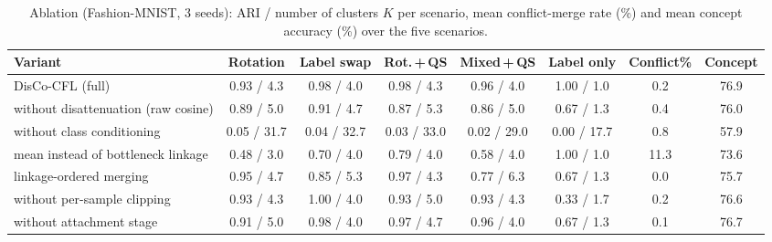 \begin{table}[!htbp]
\centering
\caption{Ablation (Fashion-MNIST, 3 seeds): ARI / number of clusters $K$ per scenario, mean conflict-merge rate (\%) and mean concept accuracy (\%) over the five scenarios.}\label{tab:abl}
\scriptsize
\setlength{\tabcolsep}{3pt}
\begin{tabular}{lccccccc}
\toprule
Variant & Rotation & Label swap & Rot.\,+\,QS & Mixed\,+\,QS & Label only & Conflict\% & Concept \\
\midrule
DisCo-CFL (full) & 0.93 / 4.3 & 0.98 / 4.0 & 0.98 / 4.3 & 0.96 / 4.0 & 1.00 / 1.0 & 0.2 & 76.9 \\
without disattenuation (raw cosine) & 0.89 / 5.0 & 0.91 / 4.7 & 0.87 / 5.3 & 0.86 / 5.0 & 0.67 / 1.3 & 0.4 & 76.0 \\
without class conditioning & 0.05 / 31.7 & 0.04 / 32.7 & 0.03 / 33.0 & 0.02 / 29.0 & 0.00 / 17.7 & 0.8 & 57.9 \\
mean instead of bottleneck linkage & 0.48 / 3.0 & 0.70 / 4.0 & 0.79 / 4.0 & 0.58 / 4.0 & 1.00 / 1.0 & 11.3 & 73.6 \\
linkage-ordered merging & 0.95 / 4.7 & 0.85 / 5.3 & 0.97 / 4.3 & 0.77 / 6.3 & 0.67 / 1.3 & 0.0 & 75.7 \\
without per-sample clipping & 0.93 / 4.3 & 1.00 / 4.0 & 0.93 / 5.0 & 0.93 / 4.3 & 0.33 / 1.7 & 0.2 & 76.6 \\
without attachment stage & 0.91 / 5.0 & 0.98 / 4.0 & 0.97 / 4.7 & 0.96 / 4.0 & 0.67 / 1.3 & 0.1 & 76.7 \\
\bottomrule
\end{tabular}
\end{table}

